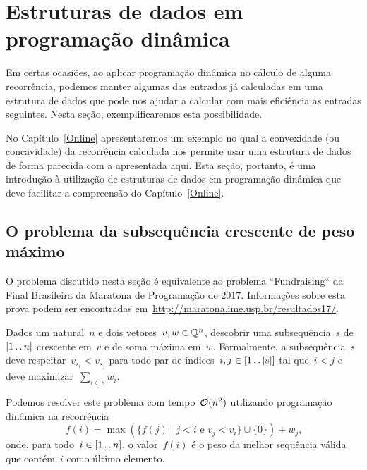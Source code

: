\chapter{Estruturas de dados em programação dinâmica}
\label{EDPD}

Em certas ocasiões, ao aplicar programação dinâmica no cálculo de alguma recorrência, podemos manter algumas das entradas já calculadas em uma estrutura de dados que pode nos ajudar a calcular com mais eficiência as entradas seguintes. Nesta seção, exemplificaremos esta possibilidade. 

No Capítulo~\ref{Online} apresentaremos um exemplo no qual a convexidade (ou concavidade) da recorrência calculada nos permite usar uma estrutura de dados de forma parecida com a apresentada aqui. Esta seção, portanto, é uma introdução à utilização de estruturas de dados em programação dinâmica que deve facilitar a compreensão do Capítulo~\ref{Online}.


\section{O problema da subsequência crescente de peso máximo}

O problema discutido nesta seção é equivalente ao problema ``Fundraising`` da Final Brasileira da Maratona de Programação de 2017. Informações sobre esta prova podem ser encontradas em~\href{http://maratona.ime.usp.br/resultados17/}{http://maratona.ime.usp.br/resultados17/}.

\begin{prob} \label{EDPD:HIS}
Dados um natural~$n$ e dois vetores~${ v,w \in \mathbb{Q}^n }$, descobrir uma subsequência~$s$ de~$[1 \,.\,.\, n]$ crescente em~$v$ e de soma máxima em~$w$. Formalmente, a subsequência~$s$ deve respeitar~${ v_{s_i} < v_{s_j} }$ para todo par de índices~${ i,j \in [1 \,.\,.\, |s|] }$ tal que~${ i < j }$ e deve maximizar~${ \sum\limits_{i \in s} w_i }$.
\end{prob}

Podemos resolver este problema com tempo~$\mathcal{O}(n^2)$ utilizando programação dinâmica na recorrência
\begin{equation} \label{EDPD:HIS:rec}
f(i) = \max(\{f(j) \mid j < i \text{ e } v_j < v_i\} \cup \{0\}) + w_j \text{,}
\end{equation}
onde, para todo~$i \in [1 \,.\,.\, n]$, o valor~$f(i)$ é o peso da melhor sequência válida que contém~$i$ como último elemento.


